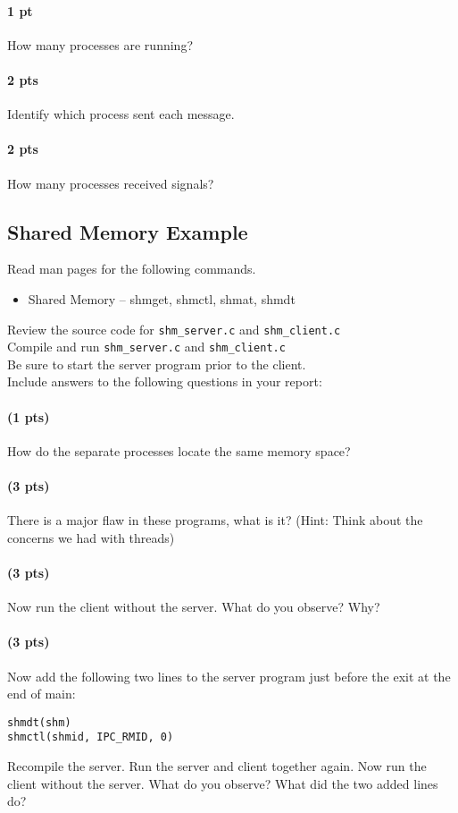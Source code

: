 \documentclass[letterpaper,10pt]{article}
\begin{document}
\paragraph{1 pt} How many processes are running?
\paragraph{2 pts} Identify which process sent each message.
\paragraph{2 pts} How many processes received signals?

\subsection{Shared Memory Example}

Read man pages for the following commands.

\begin{itemize}
 \item Shared Memory – shmget, shmctl, shmat, shmdt
\end{itemize}

\noindent Review the source code for \verb+shm_server.c+ and \verb+shm_client.c+ \\

\noindent Compile and run \verb+shm_server.c+ and \verb+shm_client.c+ \\

\noindent Be sure to start the server program prior to the client. \\

Include answers to the following questions in your report:

\paragraph{(1 pts)} How do the separate processes locate the same memory space?
\paragraph{(3 pts)} There is a major flaw in these programs, what is it? (Hint: Think about the
concerns we had with threads)
\paragraph{(3 pts)} Now run the client without the server. What do you observe? Why?
\paragraph{(3 pts)} Now add the following two lines to the server program just before the exit at the
end of main:
\begin{verbatim}
shmdt(shm)
shmctl(shmid, IPC_RMID, 0)
\end{verbatim}
Recompile the server. Run the server and client together again. Now run the client
without the server. What do you observe? What did the two added lines do?
\end{document}
